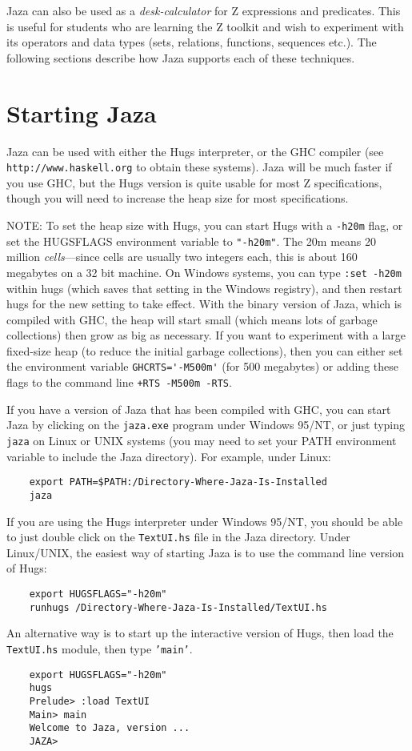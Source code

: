 \documentclass[11pt]{article}
\newcommand{\Jaza}{Jaza}
\newcommand{\url}[1]{\texttt{#1}}
\begin{document}
{\Jaza} can also be used as a \emph{desk-calculator} for Z expressions
and predicates.  This is useful for students who are learning
the Z toolkit and wish to experiment with its operators and
data types (sets, relations, functions, sequences etc.).
The following sections describe how {\Jaza} supports each of
these techniques.


\section{Starting {\Jaza}}
\label{sec:start}

{\Jaza} can be used with either the Hugs interpreter, or the GHC
compiler (see \url{http://www.haskell.org} to obtain these systems).
{\Jaza} will be much faster if you use GHC, but the Hugs version is
quite usable for most Z specifications, though you will need to
increase the heap size for most specifications.  

NOTE: To set the heap size with Hugs, you can start Hugs with a
\texttt{-h20m} flag, or set the HUGSFLAGS environment variable to
\texttt{"-h20m"}.  The 20m means 20 million \emph{cells}---since cells
are usually two integers each, this is about 160 megabytes on a 32 bit
machine.  On Windows systems, you can type \texttt{:set -h20m} within
hugs (which saves that setting in the Windows registry), and then
restart hugs for the new setting to take effect.  With the binary
version of Jaza, which is compiled with GHC, the heap will start small
(which means lots of garbage collections) then grow as big as
necessary.  If you want to experiment with a large fixed-size heap (to
reduce the initial garbage collections), then you can either set the
environment variable \verb!GHCRTS='-M500m'! (for 500 megabytes) or
adding these flags to the command line \verb!+RTS -M500m -RTS!.

If you have a version of {\Jaza} that has been compiled with GHC,
you can start Jaza by clicking on the \texttt{jaza.exe} program under
Windows 95/NT, or just typing \texttt{jaza} on Linux or UNIX systems
(you may need to set your PATH environment variable to include
the {\Jaza} directory).  For example, under Linux:
\begin{verbatim}
    export PATH=$PATH:/Directory-Where-Jaza-Is-Installed
    jaza
\end{verbatim}

If you are using the Hugs interpreter under Windows 95/NT, you should be
able to just double click on the \texttt{TextUI.hs} file in the {\Jaza}
directory.  Under Linux/UNIX, the easiest way of starting
Jaza is to use the command line version of Hugs:
\begin{verbatim}
    export HUGSFLAGS="-h20m"
    runhugs /Directory-Where-Jaza-Is-Installed/TextUI.hs
\end{verbatim}
An alternative way is to start up the interactive version of Hugs, 
then load the \texttt{TextUI.hs} module, then type \texttt{'main'}.
\begin{verbatim}
    export HUGSFLAGS="-h20m"
    hugs
    Prelude> :load TextUI
    Main> main
    Welcome to Jaza, version ...
    JAZA> 
\end{verbatim}
\end{document}
